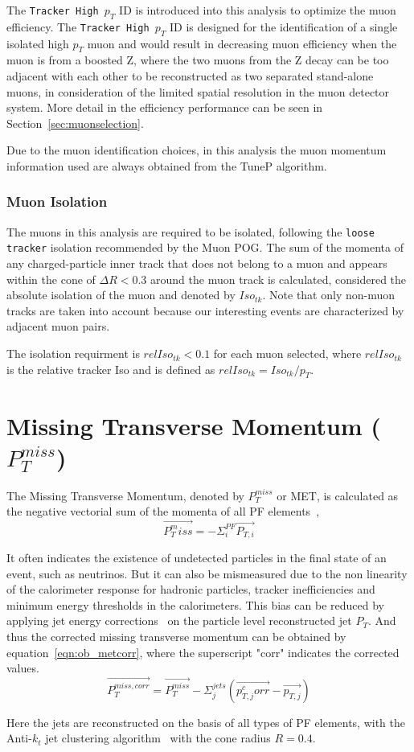The \texttt{Tracker High $p_T$} ID is introduced into this analysis to optimize the muon efficiency. The \texttt{Tracker High $p_T$} ID is designed for the identification of a single isolated high $p_T$ muon and would result in decreasing muon efficiency when the muon is from a boosted Z, where the two muons from the Z decay can be too adjacent with each other to be reconstructed as two separated stand-alone muons, in consideration of the limited spatial resolution in the muon detector system. More detail in the efficiency performance can be seen in Section~\ref{sec:muonselection}.

\vspace{0.3cm}
Due to the muon identification choices, in this analysis the muon momentum information used are always obtained from the TuneP algorithm.

\subsubsection{Muon Isolation}
The muons in this analysis are required to be isolated, following the \texttt{loose tracker} isolation recommended by the Muon POG. The sum of the momenta of any charged-particle inner track that does not belong to a muon and appears within the cone of $\Delta R<0.3$ around the muon track is calculated, considered the absolute isolation of the muon and denoted by $Iso_{tk}$. Note that only non-muon tracks are taken into account because our interesting events are characterized by adjacent muon pairs.

\vspace{0.3cm}
The isolation requirment is $relIso_{tk}<0.1$ for each muon selected, where $relIso_{tk}$ is the relative tracker Iso and is defined as $relIso_{tk}=Iso_{tk}/p_{T}$.

\section{Missing Transverse Momentum ($P_T ^{miss}$)}
The Missing Transverse Momentum, denoted by $P_T ^{miss}$ or MET, is calculated as the negative vectorial sum of the momenta of all PF elements~\cite{ob_metconst},
\begin{equation}
\vec{P_T ^miss} = -\Sigma_{i}^{PF} \vec{P_{T,i}}
\label{eqn:ob_metdef}
\end{equation}

It often indicates the existence of undetected particles in the final state of an event, such as neutrinos. But it can also be mismeasured due to the non linearity of the calorimeter response for hadronic particles, tracker inefficiencies and minimum energy thresholds in the calorimeters. This bias can be reduced by applying jet energy corrections~\cite{ob_jetcorr} on the particle level reconstructed jet $P_T$. And thus the corrected missing transverse momentum can be obtained by equation~\ref{eqn:ob_metcorr}, where the superscript "corr" indicates the corrected values.
\begin{equation}
\vec{P_T ^{miss,corr}} = \vec{P_T ^{miss}} - \Sigma_{j}^{jets} (\vec{p_{T,j} ^corr} - \vec{p_{T,j}} )
\label{eqn:ob_metcorr}
\end{equation}

Here the jets are reconstructed on the basis of all types of PF elements, with the Anti-$k_t$ jet clustering algorithm~\cite{ob_jetantikt} with the cone radius $R=0.4$.

